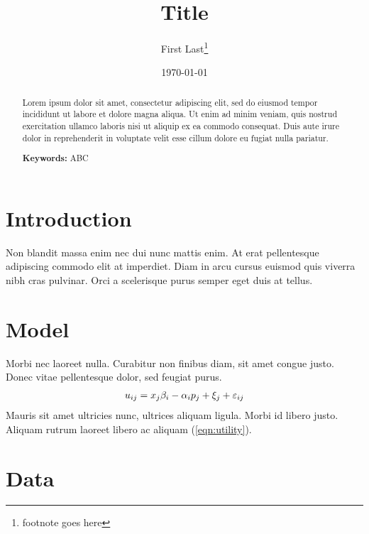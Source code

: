 \documentclass[11pt]{article}
\begin{document}
\begin{titlepage}
  \title{Title}
  \author{First Last\thanks{footnote goes here}}
  \date{\small \today}
  \maketitle
  
  \bigskip

  \begin{abstract}
    \noindent Lorem ipsum dolor sit amet, consectetur adipiscing elit, sed do eiusmod tempor incididunt ut labore et dolore magna aliqua. Ut enim ad minim veniam, quis nostrud exercitation ullamco laboris nisi ut aliquip ex ea commodo consequat. Duis aute irure dolor in reprehenderit in voluptate velit esse cillum dolore eu fugiat nulla pariatur. 

    \bigskip

    \noindent\textbf{Keywords:} ABC
  \end{abstract}

  \setcounter{page}{0}
  \thispagestyle{empty}
\end{titlepage}

\newpage

\section{Introduction} \label{sec:introduction}

\citet{koenker2001quantile} Non blandit massa enim nec dui nunc mattis enim. At erat pellentesque adipiscing commodo elit at imperdiet. Diam in arcu cursus euismod quis viverra nibh cras pulvinar. Orci a scelerisque purus semper eget duis at tellus. 

\section{Model} \label{sec:model}

Morbi nec laoreet nulla. Curabitur non finibus diam, sit amet congue justo. Donec vitae pellentesque dolor, sed feugiat purus. 
\begin{align}
  u_{ij} = x_j \beta_i - \alpha_i p_j + \xi_j + \varepsilon_{ij} \label{eqn:utility}
\end{align}
Mauris sit amet ultricies nunc, ultrices aliquam ligula. Morbi id libero justo. Aliquam rutrum laoreet libero ac aliquam (\ref{eqn:utility}).

\section{Data} \label{sec:data}
\end{document}
